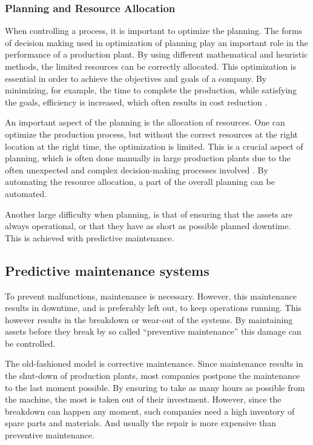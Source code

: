 \subsubsection{Planning and Resource Allocation}
When controlling a process, it is important to optimize the planning. The forms of decision making used in optimization of planning play an important role in the performance of a production plant. By using different mathematical and heuristic methods, the limited resources can be correctly allocated. This optimization is essential in order to achieve the objectives and goals of a company. By minimizing, for example, the time to complete the production, while satisfying the goals, efficiency is increased, which often results in cost reduction \citep{pinedo2005planning}.

An important aspect of the planning is the allocation of resources. One can optimize the production process, but without the correct resources at the right location at the right time, the optimization is limited. This is a crucial aspect of planning, which is often done manually in large production plants due to the often unexpected and complex decision-making processes involved \citep{pinedo2005planning}. By automating the resource allocation, a part of the overall planning can be automated.

Another large difficulty when planning, is that of ensuring that the assets are always operational, or that they have as short as possible planned downtime. This is achieved with predictive maintenance.

\subsection{Predictive maintenance systems}
To prevent malfunctions, maintenance is necessary. However, this maintenance results in downtime, and is preferably left out, to keep operations running. This however results in the breakdown or wear-out of the systems. By maintaining assets before they break by so called ``preventive maintenance'' this damage can be controlled.

The old-fashioned model is corrective maintenance. Since maintenance results in the shut-down of production plants, most companies postpone the maintenance to the last moment possible. By ensuring to take as many hours as possible from the machine, the most is taken out of their investment. However, since the breakdown can happen any moment, such companies need a high inventory of spare parts and materials.  And usually the repair is more expensive than preventive maintenance.


